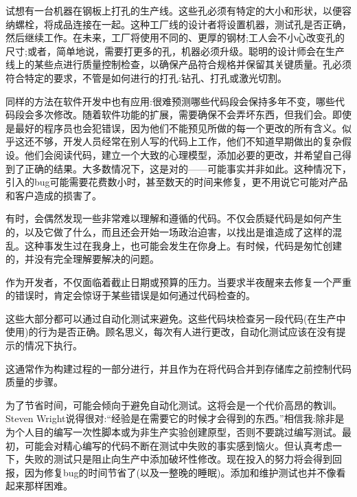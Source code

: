 试想有一台机器在钢板上打孔的生产线。这些孔必须有特定的大小和形状，以便容纳螺栓，将成品连接在一起。这种工厂线的设计者将设置机器，测试孔是否正确，然后继续工作。在未来，工厂将使用不同的、更厚的钢材;工人会不小心改变孔的尺寸;或者，简单地说，需要打更多的孔，机器必须升级。聪明的设计师会在生产线上的某些点进行质量控制检查，以确保产品符合规格并保留其关键质量。孔必须符合特定的要求，不管是如何进行的打孔:钻孔、打孔或激光切割。

同样的方法在软件开发中也有应用:很难预测哪些代码段会保持多年不变，哪些代码段会多次修改。随着软件功能的扩展，需要确保不会弄坏东西，但我们会。即使是最好的程序员也会犯错误，因为他们不能预见所做的每一个更改的所有含义。似乎这还不够，开发人员经常在别人写的代码上工作，他们不知道早期做出的复杂假设。他们会阅读代码，建立一个大致的心理模型，添加必要的更改，并希望自己得到了正确的结果。大多数情况下，这是对的——可能事实并非如此。这种情况下，引入的bug可能需要花费数小时，甚至数天的时间来修复，更不用说它可能对产品和客户造成的损害了。

有时，会偶然发现一些非常难以理解和遵循的代码。不仅会质疑代码是如何产生的，以及它做了什么，而且还会开始一场政治迫害，以找出是谁造成了这样的混乱。这种事发生过在我身上，也可能会发生在你身上。有时候，代码是匆忙创建的，并没有完全理解要解决的问题。

作为开发者，不仅面临着截止日期或预算的压力。当要求半夜醒来去修复一个严重的错误时，肯定会惊讶于某些错误是如何通过代码检查的。

这些大部分都可以通过自动化测试来避免。这些代码块检查另一段代码(在生产中使用)的行为是否正确。顾名思义，每次有人进行更改，自动化测试应该在没有提示的情况下执行。

这通常作为构建过程的一部分进行，并且作为在将代码合并到存储库之前控制代码质量的步骤。

为了节省时间，可能会倾向于避免自动化测试。这将会是一个代价高昂的教训。Steven Wright说得很对:“经验是在需要它的时候才会得到的东西。”相信我:除非是为个人目的编写一次性脚本或为非生产实验创建原型，否则不要跳过编写测试。最初，可能会对精心编写的代码不断在测试中失败的事实感到恼火。但认真考虑一下，失败的测试只是阻止向生产中添加破坏性修改。现在投入的努力将会得到回报，因为修复bug的时间节省了(以及一整晚的睡眠)。添加和维护测试也并不像看起来那样困难。





























